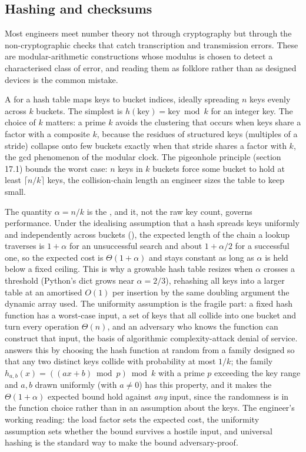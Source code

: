 \subsection{Hashing and checksums}

Most engineers meet number theory not through cryptography but
through the non-cryptographic checks that catch transcription and
transmission errors. These are modular-arithmetic constructions
whose modulus is chosen to detect a characterised class of error,
and reading them as folklore rather than as designed devices is the
common mistake.

A  for a hash table maps keys to bucket
indices, ideally spreading $n$ keys evenly across $k$ buckets. The
simplest is $h(\text{key}) = \text{key} \bmod k$ for an integer key.
The choice of $k$ matters: a prime $k$ avoids the clustering that
occurs when keys share a factor with a composite $k$, because the
residues of structured keys (multiples of a stride) collapse onto
few buckets exactly when that stride shares a factor with $k$, the
gcd phenomenon of the modular clock. The pigeonhole principle
(section 17.1) bounds the worst case: $n$ keys in $k$ buckets force
some bucket to hold at least $\lceil n/k \rceil$ keys, the
collision-chain length an engineer sizes the table to keep small.

The quantity $\alpha = n / k$ is the , and it,
not the raw key count, governs performance. Under the idealising
assumption that a hash spreads keys uniformly and independently across
buckets (), the expected length of the
chain a lookup traverses is $1 + \alpha$ for an unsuccessful search and
about $1 + \alpha/2$ for a successful one, so the expected cost is
$\Theta(1 + \alpha)$ and stays constant as long as $\alpha$ is held
below a fixed ceiling. This is why a growable hash table resizes when
$\alpha$ crosses a threshold (Python's dict grows near $\alpha =
2/3$), rehashing all keys into a larger table at an amortised $O(1)$
per insertion by the same doubling argument the dynamic array used. The
uniformity assumption is the fragile part: a fixed hash function has a
worst-case input, a set of keys that all collide into one bucket and
turn every operation $\Theta(n)$, and an adversary who knows the
function can construct that input, the basis of algorithmic
complexity-attack denial of service. 
answers this by choosing the hash function at random from a family
designed so that any two distinct keys collide with probability at most
$1/k$; the family $h_{a,b}(x) = ((a x + b) \bmod p) \bmod k$ with a
prime $p$ exceeding the key range and $a, b$ drawn uniformly (with $a
\neq 0$) has this property, and it makes the $\Theta(1 + \alpha)$
expected bound hold against \emph{any} input, since the randomness is
in the function choice rather than in an assumption about the keys. The
engineer's working reading: the load factor sets the expected cost, the
uniformity assumption sets whether the bound survives a hostile input,
and universal hashing is the standard way to make the bound
adversary-proof.

